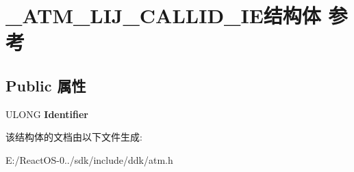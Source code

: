 \hypertarget{struct___a_t_m___l_i_j___c_a_l_l_i_d___i_e}{}\section{\+\_\+\+A\+T\+M\+\_\+\+L\+I\+J\+\_\+\+C\+A\+L\+L\+I\+D\+\_\+\+I\+E结构体 参考}
\label{struct___a_t_m___l_i_j___c_a_l_l_i_d___i_e}
\subsection*{Public 属性}
\begin{DoxyCompactItemize}
\item 
\mbox{\label{struct___a_t_m___l_i_j___c_a_l_l_i_d___i_e_a396856dae506837a566aeed56a3e8232}} 
U\+L\+O\+NG {\bfseries Identifier}
\end{DoxyCompactItemize}


该结构体的文档由以下文件生成\+:\begin{DoxyCompactItemize}
\item 
E\+:/\+React\+O\+S-\/0../sdk/include/ddk/atm.\+h\end{DoxyCompactItemize}

